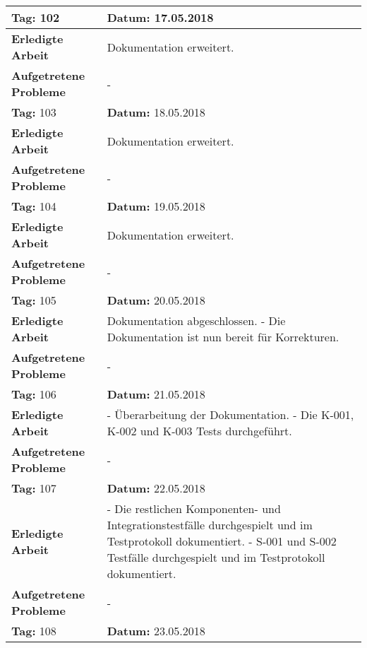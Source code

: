 \begin{longtable}{|p{5cm}|p{5cm}p{6cm}|}
\rowcolor{heading}\textbf{Tag:} 102 & \textbf{Datum:} 17.05.2018 & \\ \hline
\textbf{Erledigte Arbeit} & \multicolumn{2}{p{11cm}|}{Dokumentation erweitert.} \\ \hline
\textbf{Aufgetretene Probleme} & \multicolumn{2}{p{11cm}|}{-} \\ \hline
\rowcolor{heading}\textbf{Tag:} 103 & \textbf{Datum:} 18.05.2018 & \\ \hline
\textbf{Erledigte Arbeit} & \multicolumn{2}{p{11cm}|}{Dokumentation erweitert.} \\ \hline
\textbf{Aufgetretene Probleme} & \multicolumn{2}{p{11cm}|}{-} \\ \hline
\rowcolor{heading}\textbf{Tag:} 104 & \textbf{Datum:} 19.05.2018 & \\ \hline
\textbf{Erledigte Arbeit} & \multicolumn{2}{p{11cm}|}{Dokumentation erweitert.} \\ \hline
\textbf{Aufgetretene Probleme} & \multicolumn{2}{p{11cm}|}{-} \\ \hline
\rowcolor{heading}\textbf{Tag:} 105 & \textbf{Datum:} 20.05.2018 & \\ \hline
\textbf{Erledigte Arbeit} & \multicolumn{2}{p{11cm}|}{Dokumentation abgeschlossen. \newline
- Die Dokumentation ist nun bereit für Korrekturen.} \\ \hline
\textbf{Aufgetretene Probleme} & \multicolumn{2}{p{11cm}|}{-} \\ \hline
\rowcolor{heading}\textbf{Tag:} 106 & \textbf{Datum:} 21.05.2018 & \\ \hline
\textbf{Erledigte Arbeit} & \multicolumn{2}{p{11cm}|}{- Überarbeitung der Dokumentation. \newline
- Die K-001, K-002 und K-003 Tests durchgeführt. } \\ \hline
\textbf{Aufgetretene Probleme} & \multicolumn{2}{p{11cm}|}{-} \\ \hline
\rowcolor{heading}\textbf{Tag:} 107 & \textbf{Datum:} 22.05.2018 & \\ \hline
\textbf{Erledigte Arbeit} & \multicolumn{2}{p{11cm}|}{- Die restlichen Komponenten- und Integrationstestfälle durchgespielt und im Testprotokoll dokumentiert.\newline 
- S-001 und S-002 Testfälle durchgespielt und im Testprotokoll dokumentiert.} \\ \hline
\textbf{Aufgetretene Probleme} & \multicolumn{2}{p{11cm}|}{-} \\ \hline
\rowcolor{heading}\textbf{Tag:} 108 & \textbf{Datum:} 23.05.2018 & \\ \hline

\end{longtable}
